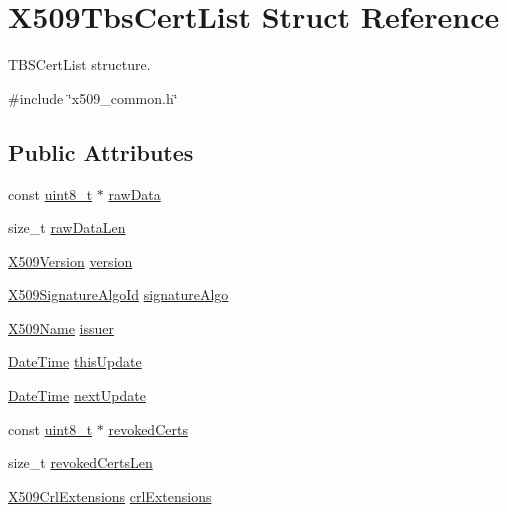 \hypertarget{structX509TbsCertList}{}\section{X509\+Tbs\+Cert\+List Struct Reference}
\label{structX509TbsCertList}


T\+B\+S\+Cert\+List structure.  




{\ttfamily \#include \char`\"{}x509\+\_\+common.\+h\char`\"{}}

\subsection*{Public Attributes}
\begin{DoxyCompactItemize}
\item 
const \hyperlink{stdint_8h_aba7bc1797add20fe3efdf37ced1182c5}{uint8\+\_\+t} $\ast$ \hyperlink{structX509TbsCertList_a8d919d7ecf86468c7fff027d4c981041}{raw\+Data}
\item 
size\+\_\+t \hyperlink{structX509TbsCertList_aec6e5364f510fc217462bf130c861a3f}{raw\+Data\+Len}
\item 
\hyperlink{certificate_2x509__common_8h_a42c631650a1a4fbe9d70d54d99dcac26}{X509\+Version} \hyperlink{structX509TbsCertList_aec546d0e6c62aee6789d27f84f5b2174}{version}
\item 
\hyperlink{structX509SignatureAlgoId}{X509\+Signature\+Algo\+Id} \hyperlink{structX509TbsCertList_a9ddc6a9135a428e613a32a70efdd7d90}{signature\+Algo}
\item 
\hyperlink{structX509Name}{X509\+Name} \hyperlink{structX509TbsCertList_adbb517b77f6ccf54375d3453ca3966c1}{issuer}
\item 
\hyperlink{structDateTime}{Date\+Time} \hyperlink{structX509TbsCertList_aa762248fe58816b5353994f18d906b11}{this\+Update}
\item 
\hyperlink{structDateTime}{Date\+Time} \hyperlink{structX509TbsCertList_aa3573e4d72e2170ad201f25be63c0276}{next\+Update}
\item 
const \hyperlink{stdint_8h_aba7bc1797add20fe3efdf37ced1182c5}{uint8\+\_\+t} $\ast$ \hyperlink{structX509TbsCertList_a196e7acd7a1e03020bdb9d798dc527fb}{revoked\+Certs}
\item 
size\+\_\+t \hyperlink{structX509TbsCertList_a074f15ba5a4ccc717f658730392f5de8}{revoked\+Certs\+Len}
\item 
\hyperlink{structX509CrlExtensions}{X509\+Crl\+Extensions} \hyperlink{structX509TbsCertList_a084e1f8c74fb44d6a347df943a0dc728}{crl\+Extensions}
\end{DoxyCompactItemize}


